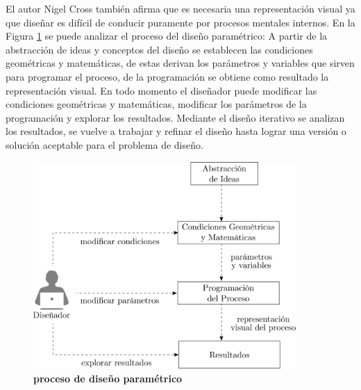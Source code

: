 El autor Nigel Cross \citep{Kaled2016} también afirma que es necesaria una representación visual ya que diseñar es difícil de conducir puramente por procesos mentales internos. En la Figura \ref{fig:procesopar} se puede analizar el proceso del diseño paramétrico: A partir de la abstracción de ideas y conceptos del diseño se establecen las condiciones geométricas y matemáticas, de estas derivan los parámetros y variables que sirven para programar el proceso, de la programación se obtiene como resultado la representación visual. En todo momento el diseñador puede modificar las condiciones geométricas y matemáticas, modificar los parámetros de la programación y explorar los resultados. Mediante el diseño iterativo se analizan los resultados, se vuelve a trabajar y refinar el diseño hasta lograr una versión o solución aceptable para el problema de diseño. 

\begin{figure}[h]
\includegraphics[width=10cm]{Img/CPD/diseno.png}
\centering
\caption{\textbf{\footnotesize{proceso de diseño paramétrico}}}
\label{fig:procesopar}
\end{figure}


